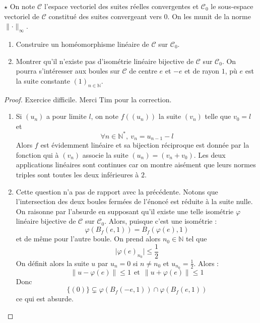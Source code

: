 \documentclass[french,a4paper]{article}
\newcommand{\N}{\mathbb{N}}
\newcommand{\st}{^*}
\theoremstyle{plain}
\theoremstyle{definition}
\theoremstyle{remark}
\begin{document}
\begin{ex}[Moulin.30]{$\star$}
	On note $\mathcal{C}$ l'espace vectoriel des suites réelles convergentes et $\mathcal{C}_0$ le sous-espace vectoriel de $\mathcal{C}$ constitué des suites convergeant vers $0$. On les munit de la norme $\lVert\cdot\rVert_\infty$.
	\begin{enumerate}
		\item Construire un homéomorphisme linéaire de $\mathcal{C}$ sur $\mathcal{C}_0$.
		\item Montrer qu'il n'existe pas d'isométrie linéaire bijective de $\mathcal{C}$ sur $\mathcal{C}_0$. On pourra s'intéresser aux boules sur $\mathcal{C}$ de centre $e$ et $-e$ et de rayon $1$, pù $e$ est la suite constante $(1)_{n\in\N}$.		
	\end{enumerate}
\end{ex}
\begin{proof}
	Exercice difficile. Merci Tim pour la correction.
	\begin{enumerate}
		\item Si $(u_n)$ a pour limite $l$, on note $f((u_n))$ la suite $(v_n)$ telle que $v_0=l$ et $$\forall n\in\N\st,\ v_{n}=u_{n-1}-l$$ Alors $f$ est évidemment linéaire et sa bijection réciproque est donnée par la fonction qui à $(v_n)$ associe la suite $(u_n)=(v_n+v_0)$. Les deux applications linéaires sont continues car on montre aisément que leurs normes triples sont toutes les deux inférieures à $2$.
		\item Cette question n'a pas de rapport avec la précédente. Notons que l'intersection des deux boules fermées de l'énoncé est réduite à la suite nulle. On raisonne par l'absurde en supposant qu'il existe une telle isométrie $\varphi$ linéaire bijective de $\mathcal{C}$ sur $\mathcal{C}_0$. Alors, puisque c'est une isométrie : $$\varphi\left(B_f(e,1)\right)=B_f(\varphi(e),1)$$ et de même pour l'autre boule. On prend alors $n_0\in\N$ tel que $$\lvert\varphi(e)_{n_0}\rvert\leqslant\frac{1}{2}$$ On définit alors la suite $u$ par $u_n=0$ si $n\ne n_0$ et $u_{n_0}=\displaystyle\frac{1}{2}$. Alors : $$\lVert u-\varphi(e)\rVert\leqslant 1\ \ \text{et} \ \ \lVert u+\varphi(e)\rVert\leqslant 1$$ Donc $$\{(0)\}\subsetneq \varphi\left(B_f(-e,1)\right)\cap \varphi\left(B_f(e,1)\right)$$ ce qui est absurde.
	\end{enumerate}
\end{proof}
\end{document}
